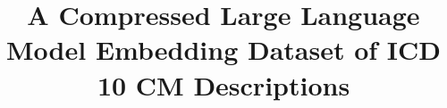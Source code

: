 \documentclass{bmcart}
\begin{document}
\begin{frontmatter}

\begin{fmbox}


\title{A Compressed Large Language Model Embedding Dataset of ICD 10 CM 
Descriptions}


\author[
  addressref={aff1},                   %
  corref={aff1},                       %
  email={michael.kane@yale.edu}   %
]{ }
\author[
  addressref={aff2,aff3},
  email={casey.king@yale.edu}
]{ }
\author[
  addressref={aff1},
  email={denise.esserman@yale.edu}
]{ }
\author[
  addressref={aff4},
  email={nklatham@bwh.harvard.edu}
]{ }
\author[
  addressref={aff1},
  email={erich.greene@yale.edu}
]{ }
\author[
  addressref={aff5},
  email={dganz@mednet.ucla.edu}
]{ }



\end{fmbox}
\end{frontmatter}
\end{document}
